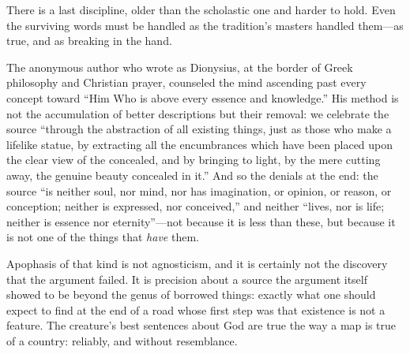 There is a last discipline, older than the scholastic one and harder to hold. Even the surviving words must be handled as the tradition's masters handled them---as true, and as breaking in the hand.

The anonymous author who wrote as Dionysius, at the border of Greek philosophy and Christian prayer, counseled the mind ascending past every concept toward ``Him Who is above every essence and knowledge.'' His method is not the accumulation of better descriptions but their removal: we celebrate the source ``through the abstraction of all existing things, just as those who make a lifelike statue, by extracting all the encumbrances which have been placed upon the clear view of the concealed, and by bringing to light, by the mere cutting away, the genuine beauty concealed in it.'' And so the denials at the end: the source ``is neither soul, nor mind, nor has imagination, or opinion, or reason, or conception; neither is expressed, nor conceived,'' and neither ``lives, nor is life; neither is essence nor eternity''---not because it is less than these, but because it is not one of the things that \emph{have} them.

Apophasis of that kind is not agnosticism, and it is certainly not the discovery that the argument failed. It is precision about a source the argument itself showed to be beyond the genus of borrowed things: exactly what one should expect to find at the end of a road whose first step was that existence is not a feature. The creature's best sentences about God are true the way a map is true of a country: reliably, and without resemblance.

